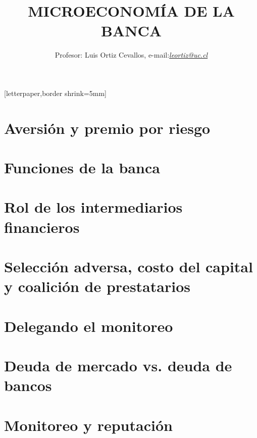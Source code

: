 \def\presentationMode{0}

\usepackage{pgfpages}
[letterpaper,border shrink=5mm]


\author[Luis Ortiz Cevallos e-mail: \href{leortiz@uc.cl}{\textit{leortiz@uc.cl}}]{Profesor: Luis Ortiz Cevallos, e-mail:\href{leortiz@uc.cl}{\textit{leortiz@uc.cl}} }
\title[MICROECONOMÍA DE LA BANCA]{\vspace*{1.0em} MICROECONOMÍA DE LA BANCA}
\date[\href{https://ortiz-cevallos.github.io/luisortiz.github.io/ }{\textit{https://ortiz-cevallos.github.io/luisortiz.github.io/}}]{}










%







\makeFrameTitle

\section{Aversión y premio por riesgo}

\section{Funciones de la banca}

\section{Rol de los intermediarios financieros}

\section{Selección adversa, costo del capital y coalición de prestatarios}

\section{Delegando el monitoreo}

\section{Deuda de mercado vs. deuda de bancos}

\section{Monitoreo y reputación}


